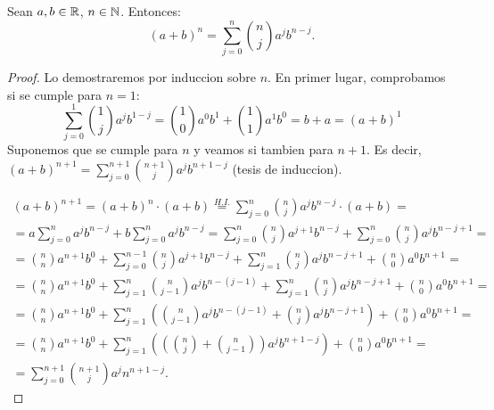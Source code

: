 \begin{theorem}
	Sean \(a,b \in \mathbb{R} \), \(n \in \mathbb{N} \). Entonces:
	\[
		(a+b)^{n} = \sum_{j =0 }^{n } \binom{n }{j } a^{j} b^{n-j }.
	\]
\end{theorem}
\begin{proof}
	Lo demostraremos por induccion sobre \(n \). En primer lugar, comprobamos si se cumple para \(n = 1 \):
	\[
		\sum_{j =0 }^{1 } \binom{1 }{j } a^{j} b^{1-j } = \binom{1 }{0 } a^{0 } b^{1 } + \binom{1 }{1 } a^{1 } b^{0} = b + a = (a+b)^{1}
	\]
	Suponemos que se cumple para \(n \) y veamos si tambien para \(n + 1 \). Es decir, \((a+b)^{n+1} = \sum_{j =0 }^{n+1 } \binom{n+ 1 }{j } a^{j } b^{n + 1 - j } \) (tesis de induccion).
	
	\begin{multline*}
		(a+b)^{n+1} = (a+b)^{n} \cdot (a+b) \overset{H.I.}{=} \sum_{j =0 }^{n } \binom{n }{j } a^{j} b^{n-j } \cdot (a+b) = \\
		= a \sum_{j =0 }^{n } a^{j} b^{n-j } + b \sum_{j =0 }^{n } a^{j} b^{n-j } = \sum_{j =0 }^{n } \binom{n }{j }a^{j+1} b^{n-j } + \sum_{j =0 }^{n } \binom{n }{j } a^{j} b^{n-j+1} = \\
		= \binom{n }{n } a^{n+1} b^{0 } + \sum_{j =0 }^{n- 1} \binom{n }{j } a^{j+ 1 } b^{n-j } + \sum_{j =1}^{n }  \binom{n }{j } a^{j } b^{n-j + 1 } + \binom{n }{0} a^{0 }b^{n+1} = \\
		= \binom{n }{n }a^{n+1 } b^{0} + \sum_{j =1 }^{n} \binom{n }{j - 1} a^{j}b^{n-(j-1)} + \sum_{j =1}^{n } \binom{n }{j }a^{j } b^{n-j+1 } + \binom{n }{0 }a^{0 } b^{n+1 } = \\
		= \binom{n }{n }a^{n+1 } b^{0} + \sum_{j =1}^{n } \left (\binom{n }{j - 1 } a^{j } b^{n-(j-1)} + \binom{n }{j } a^{j } b^{n-j+1}\right ) + \binom{n}{0} a^{0 } b^{n+1} =  \\
		= \binom{n }{n }a^{n+1 } b^{0 } + \sum_{j=1}^{n} \left ( \left (\binom{n }{j } + \binom{n }{j - 1} \right ) a^{j }b^{n+1-j}  \right ) + \binom{n }{0 }a^{0 } b^{n+1} = \\
		= \boxed{\sum_{j =0 }^{n+ 1} \binom{n + 1 }{j }a^{j } n^{n+1-j }}.
	\end{multline*}
\end{proof}

